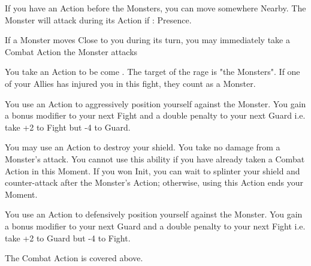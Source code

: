 {  
  If you have an Action before the Monsters, you can move somewhere Nearby.  The Monster will attack during its Action if \RS : Presence.

  If a Monster moves Close to you during its turn, you may immediately take a Combat Action  the Monster attacks

  You take an Action to be come .  The target of the rage is "the Monsters". If one of your Allies has injured you in this fight, they count as a Monster.


  You use an Action to aggressively position yourself against the Monster.  You gain a bonus modifier to your next Fight \RO and a double penalty to your next Guard \RO i.e. take +2 to Fight but -4 to Guard.


  You may use an Action to destroy your shield.  You take no  damage from a Monster's attack.  You cannot use this ability if you have already taken a Combat Action in this Moment.  If you won Init, you can wait to splinter your shield and counter-attack after the Monster's Action; otherwise, using this Action ends your Moment.


  You use an Action to defensively position yourself against the Monster.  You gain a bonus modifier to your next Guard \RO and a double penalty to your next Fight \RO i.e. take +2 to Guard but -4 to Fight.



  The  Combat Action is covered above.



}
